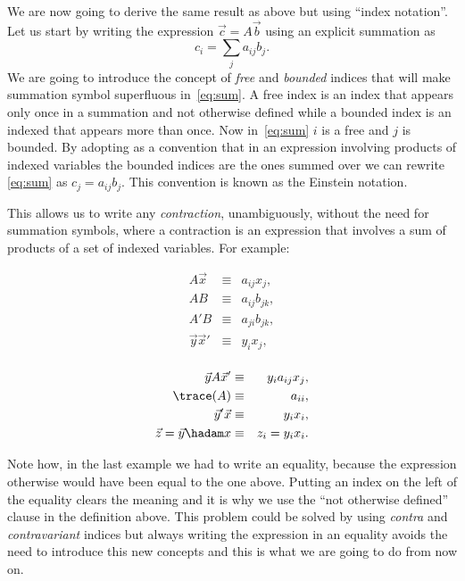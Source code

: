 \documentclass{article}
\begin{document}
We are now going to derive the same result as above but using ``index
notation''. Let us start by writing the expression \(\vec c = A \vec b\) using an
explicit summation as
\begin{equation}
	c_i = \sum_j a_{ij} b_j. \label{eq:sum}
\end{equation}
We are going to introduce the concept of \emph{free} and \emph{bounded} indices
that will make summation symbol superfluous in~\ref{eq:sum}. A free index is an
index that appears only once in a summation and not otherwise defined while a
bounded index is an indexed that appears more than once. Now in~\ref{eq:sum}
\(i\) is a free and \(j\) is bounded. By adopting as a convention that in an
expression involving products of indexed variables the bounded indices are the
ones summed over we can rewrite \ref{eq:sum} as \(c_j = a_{ij} b_{j}\). This
convention is known as the Einstein notation.

This allows us to write any \emph{contraction}, unambiguously, without the need
for summation symbols, where a contraction is an expression that involves a sum
of products of a set of indexed variables. For example:

\noindent
\begin{minipage}{.5\textwidth}
\begin{eqnarray*}
A \vec x &\equiv& a_{ij} x_j, \\
A B &\equiv& a_{ij} b_{jk}, \\
A' B &\equiv& a_{ji} b_{jk}, \\
\vec y \vec x' &\equiv& y_i x_j,\\
\end{eqnarray*}
\end{minipage}
\begin{minipage}{.5\textwidth}
\begin{eqnarray*}
\vec y A \vec x' &\equiv& y_i a_{ij} x_j, \\
\trace(A) &\equiv& a_{ii}, \\
\vec y' \vec x &\equiv& y_i x_i, \\
\vec z = \vec y \hadam x &\equiv& z_i = y_i x_i.\\
\end{eqnarray*}
\end{minipage}

Note how, in the last example we had to write an equality, because the
expression otherwise would have been equal to the one above. Putting an index on
the left of the equality clears the meaning and it is why we use
the ``not otherwise defined'' clause in the definition above. This problem could
be solved by using \emph{contra} and \emph{contravariant} indices but always
writing the expression in an equality avoids the need to introduce this new
concepts and this is what we are going to do from now on.
\end{document}
